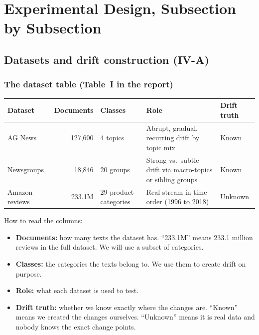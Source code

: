 \documentclass[11pt,a4paper]{article}
\begin{document}
\section{Experimental Design, Subsection by Subsection}
\label{sec:exp}

\subsection{Datasets and drift construction (IV-A)}

\subsubsection*{The dataset table (Table~I in the report)}

\begin{center}
\small
\begin{tabular}{>{\raggedright\arraybackslash}p{2.3cm}rl>{\raggedright\arraybackslash}p{4.6cm}l}
\toprule
Dataset & Documents & Classes & Role & Drift truth \\
\midrule
AG News & 127,600 & 4 topics & Abrupt, gradual, recurring drift by topic mix & Known \\
20 Newsgroups & 18,846 & 20 groups & Strong vs.\ subtle drift via macro-topics or sibling groups & Known \\
Amazon reviews & 233.1M & 29 product categories & Real stream in time order (1996 to 2018) & Unknown \\
\bottomrule
\end{tabular}
\end{center}

How to read the columns:
\begin{itemize}
\item \textbf{Documents:} how many texts the dataset has. ``233.1M'' means 233.1 million reviews in the full dataset. We will use a subset of categories.
\item \textbf{Classes:} the categories the texts belong to. We use them to create drift on purpose.
\item \textbf{Role:} what each dataset is used to test.
\item \textbf{Drift truth:} whether we know exactly where the changes are. ``Known'' means we created the changes ourselves. ``Unknown'' means it is real data and nobody knows the exact change points.
\end{itemize}
\end{document}
